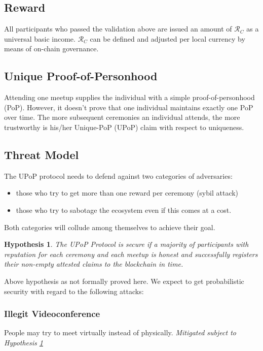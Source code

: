 \documentclass[conference]{IEEEtran}
\newtheorem{hypothesis}{Hypothesis}
\begin{document}
\subsection{Reward}
All participants who passed the validation above are issued an amount of $\mathcal{R}_C$ as a universal basic income. $\mathcal{R}_C$ can be defined and adjusted per local currency by means of on-chain governance.  

\subsection{Unique Proof-of-Personhood}
Attending one meetup supplies the individual with a simple proof-of-personhood (PoP). However, it doesn't prove that one individual maintains exactly one PoP over time. The more subsequent ceremonies an individual attends, the more trustworthy is his/her Unique-PoP (UPoP) claim with respect to uniqueness.

\subsection{Threat Model}
The \encointer UPoP protocol needs to defend against two categories of adversaries:
\begin{itemize}
	\item those who try to get more than one reward per ceremony (sybil attack)
	\item those who try to sabotage the \encointer ecosystem even if this comes at a cost.
\end{itemize}
Both categories will collude among themselves to achieve their goal.

\begin{hypothesis}\label{hypothesis:secureifmajorityhonest}
	The \encointer UPoP Protocol is secure if a majority of participants with reputation for each ceremony and each meetup is honest and successfully registers their non-empty attested claims to the blockchain in time. 
\end{hypothesis}

Above hypothesis as not formally proved here. We expect to get probabilistic security with regard to the following attacks:

\subsubsection{Illegit Videoconference}
People may try to meet virtually instead of physically. \emph{Mitigated subject to Hypothesis \ref{hypothesis:secureifmajorityhonest}}
\end{document}
